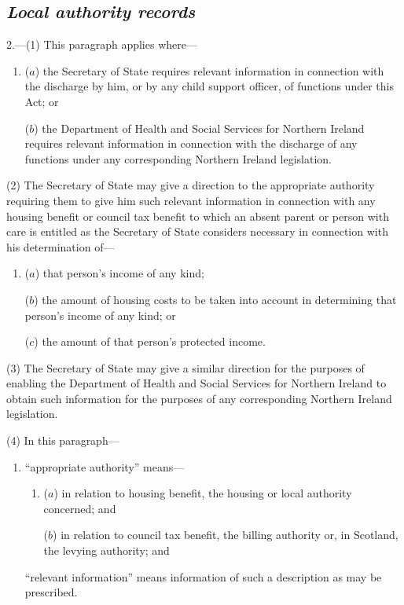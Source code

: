 \documentclass[12pt,a4paper]{article}
\begin{document}

\subsection*{\itshape Local authority records}

2.---(1) This paragraph applies where—
\begin{enumerate}\item[]
($a$) the Secretary of State requires relevant information in connection with the discharge by him, or by any child support officer, of functions under this Act; or

($b$) the Department of Health and Social Services for Northern Ireland requires relevant information in connection with the discharge of any functions under any corresponding Northern Ireland legislation.
\end{enumerate}

(2) The Secretary of State may give a direction to the appropriate authority requiring them to give him such relevant information in connection with any housing benefit or 
council tax benefit  %
to which an absent parent or person with care is entitled as the Secretary of State considers necessary in connection with his determination of—
\begin{enumerate}\item[]
($a$) that person’s income of any kind;

($b$) the amount of housing costs to be taken into account in determining that person’s income of any kind; or

($c$) the amount of that person’s protected income.
\end{enumerate}

(3) The Secretary of State may give a similar direction for the purposes of enabling the Department of Health and Social Services for Northern Ireland to obtain such information for the purposes of any corresponding Northern Ireland legislation.

(4) In this paragraph—
\begin{enumerate}\item[]
    “appropriate authority” means—
\begin{enumerate}\item[]
    ($a$) 
    in relation to housing benefit, the housing or local authority concerned; and

    ($b$) 
    in relation to 
council tax benefit, the billing authority  %
or, in Scotland, the levying authority; and
\end{enumerate}

    “relevant information” means information of such a description as may be prescribed. 
\end{enumerate}
\end{document}
